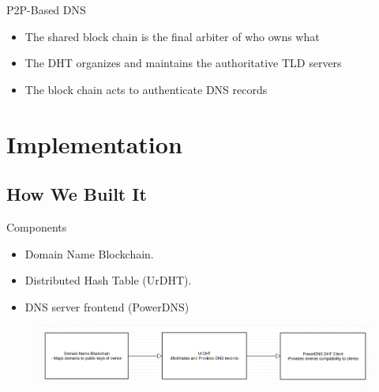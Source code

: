 \documentclass[11pt]{beamer}
\begin{document}
\begin{frame}{P2P-Based DNS}
	
	\begin{itemize}
		\item The shared block chain is the final arbiter of who owns what
		\item The DHT organizes and maintains the authoritative TLD servers
		\item The block chain acts to authenticate DNS records
	\end{itemize}
\end{frame}



\section{Implementation}

\subsection{How We Built It}

\begin{frame}{Components}
	
	
	\begin{itemize}
		\item Domain Name Blockchain. 
		\item Distributed Hash Table (UrDHT).
		\item DNS server frontend (PowerDNS)
	\end{itemize}
	
	\begin{figure}
		\centering
		\includegraphics[width=\linewidth]{arch}
		\label{fig:arch}
	\end{figure}
	
\end{frame}


\end{document}
